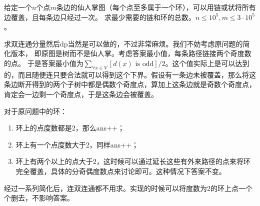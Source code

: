 \begin{prob}
	给定一个$n$个点$m$条边的仙人掌图（每个点至多属于一个环），可以用链或状将所有边覆盖，且每条边只经过一次。
	求最少需要的链和环的总数。$n \le 10^5, m \le 3 \cdot 10^5$。
\end{prob}

\begin{sol}
	求双连通分量然后dp当然是可以做的，不过非常麻烦。我们不妨考虑原问题的简化版本，
	即原图是树而不是仙人掌。考虑答案最小值，每条路径链接两个奇度数的点。
	于是答案最小值为$\sum_{\forall x \in V}{[d(x)\text{ is odd}]}/2$。这个值实际上是可以达到的，而且随便连只要合法就可以得到这个下界。假设有一条边未被覆盖，那么将这条边断开得到的两个子树中都是偶数个奇度点，算加上这条边就是奇数个奇度点，肯定会一边剩一个奇度点，于是这条边会被覆盖。

	\par
	对于原问题中的环：
	\begin{enumerate}
		\item 环上的点度数都是2，那么ans++；
		\item 环上有一个点度数大于2，同样ans++；
		\item 环上有两个以上的点大于2，这时候可以通过延长这些有外来路径的点来将环完全覆盖，具体的分奇偶度数点来讨论即可。这种情况下答案不变。
	\end{enumerate}
	经过一系列简化后，连双连通都不用求。实现的时候可以将度数为2的环上点一个个删去，不影响答案。

\end{sol}
